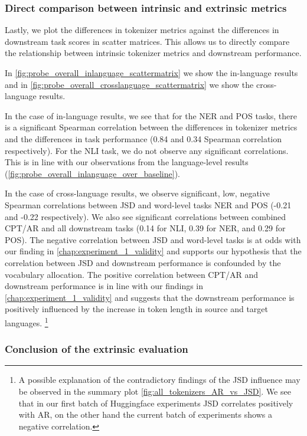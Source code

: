 \subsubsection{Direct comparison between intrinsic and extrinsic metrics}

Lastly, we plot the differences in tokenizer metrics against the differences in downstream task scores in scatter matrices. This allows us to directly compare the relationship between intrinsic tokenizer metrics and downstream performance.

In \autoref{fig:probe_overall_inlanguage_scattermatrix} we show the in-language results and in \autoref{fig:probe_overall_crosslanguage_scattermatrix} we show the cross-language results. 

In the case of in-language results, we see that for the NER and POS tasks, there is a significant Spearman correlation between the differences in tokenizer metrics and the differences in task performance (0.84 and 0.34 Spearman correlation respectively). For the NLI task, we do not observe any significant correlations. This is in line with our observations from the language-level results (\autoref{fig:probe_overall_inlanguage_over_baseline}). 

In the case of cross-language results, we observe significant, low, negative Spearman correlations between JSD and word-level tasks NER and POS (-0.21 and -0.22 respectively). We also see significant correlations between combined CPT/AR and all downstream tasks (0.14 for NLI, 0.39 for NER, and 0.29 for POS). The negative correlation between JSD and word-level tasks is at odds with our finding in \autoref{chap:experiment_1_validity} and supports our hypothesis that the correlation between JSD and downstream performance is confounded by the vocabulary allocation. The positive correlation between CPT/AR and downstream performance is in line with our findings in \autoref{chap:experiment_1_validity} and suggests that the downstream performance is positively influenced by the increase in token length in source and target languages. \footnote{A possible explanation of the contradictory findings of the JSD influence may be observed in the summary plot \autoref{fig:all_tokenizers_AR_vs_JSD}. We see that in our first batch of Huggingface experiments JSD correlates positively with AR, on the other hand the current batch of experiments shows a negative correlation.}

\subsubsection{Conclusion of the extrinsic evaluation}

